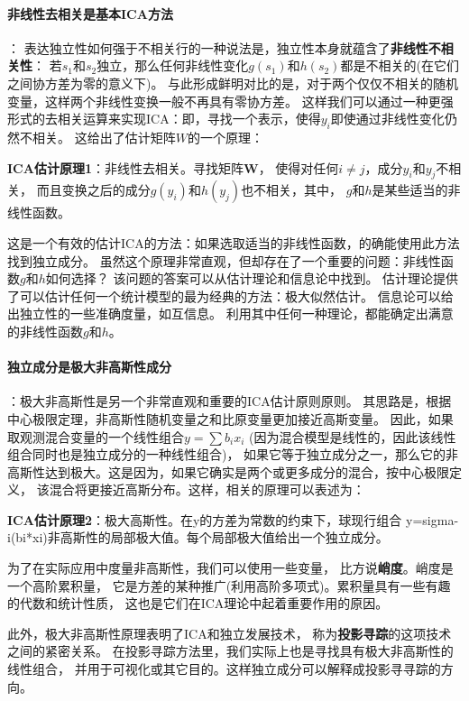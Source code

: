 \paragraph*{非线性去相关是基本ICA方法}：
表达独立性如何强于不相关行的一种说法是，独立性本身就蕴含了\textbf{非线性不相关性}：
若$s_1$和$s_2$独立，那么任何非线性变化$g(s_1)$和$h(s_2)$都是不相关的(在它们之间协方差为零的意义下)。
与此形成鲜明对比的是，对于两个仅仅不相关的随机变量，这样两个非线性变换一般不再具有零协方差。
这样我们可以通过一种更强形式的去相关运算来实现ICA：即，寻找一个表示，使得$y_i$即使通过非线性变化仍然不相关。
这给出了估计矩阵$W$的一个原理：

\textbf{ICA估计原理1}：非线性去相关。寻找矩阵$\bm{W}$，
使得对任何$i \ne j$，成分$y_i$和$y_j$不相关，
而且变换之后的成分$g(y_i)$和$h(y_j)$也不相关，其中，
$g$和$h$是某些适当的非线性函数。

这是一个有效的估计ICA的方法：如果选取适当的非线性函数，的确能使用此方法找到独立成分。
虽然这个原理非常直观，但却存在了一个重要的问题：非线性函数$g$和$h$如何选择？
该问题的答案可以从估计理论和信息论中找到。
估计理论提供了可以估计任何一个统计模型的最为经典的方法：极大似然估计。
信息论可以给出独立性的一些准确度量，如互信息。
利用其中任何一种理论，都能确定出满意的非线性函数$g$和$h$。
    
\paragraph*{独立成分是极大非高斯性成分}：极大非高斯性是另一个非常直观和重要的ICA估计原则原则。
其思路是，根据中心极限定理，非高斯性随机变量之和比原变量更加接近高斯变量。
因此，如果取观测混合变量的一个线性组合$y=\sum b_i x_i$
(因为混合模型是线性的，因此该线性组合同时也是独立成分的一种线性组合)，
如果它等于独立成分之一，那么它的非高斯性达到极大。这是因为，如果它确实是两个或更多成分的混合，按中心极限定义，
该混合将更接近高斯分布。这样，相关的原理可以表述为：

	\textbf{ICA估计原理2}：极大高斯性。在y的方差为常数的约束下，球现行组合
	y=sigma-i(bi*xi)非高斯性的局部极大值。每个局部极大值给出一个独立成分。
    
	为了在实际应用中度量非高斯性，我们可以使用一些变量，
比方说\textbf{峭度}。峭度是一个高阶累积量，
它是方差的某种推广(利用高阶多项式)。累积量具有一些有趣的代数和统计性质，
这也是它们在ICA理论中起着重要作用的原因。
    
此外，极大非高斯性原理表明了ICA和独立发展技术，
称为\textbf{投影寻踪}的这项技术之间的紧密关系。
在投影寻踪方法里，我们实际上也是寻找具有极大非高斯性的线性组合，
并用于可视化或其它目的。这样独立成分可以解释成投影寻寻踪的方向。
    
